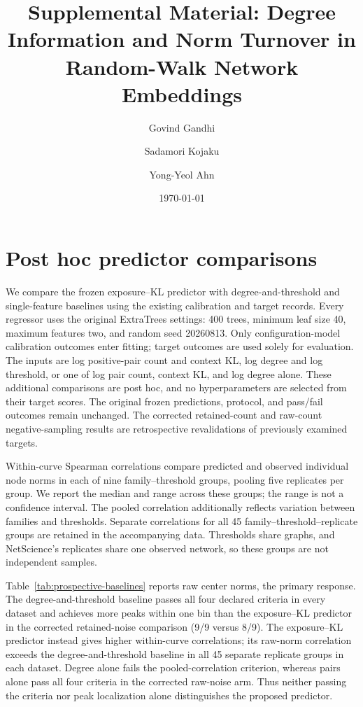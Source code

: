 \documentclass[aps,pre,onecolumn,10pt,superscriptaddress]{revtex4-2}
\begin{document}
\title{Supplemental Material: Degree Information and Norm Turnover in Random-Walk Network Embeddings}
\author{Govind Gandhi}
\author{Sadamori Kojaku}
\author{Yong-Yeol Ahn}
\date{\today}
\maketitle

\section{Post hoc predictor comparisons}
\label{sec:predictor-comparison}

We compare the frozen exposure--KL predictor with degree-and-threshold and single-feature baselines using the existing calibration and target records.
Every regressor uses the original ExtraTrees settings: 400 trees, minimum leaf size 40, maximum features two, and random seed 20260813.
Only configuration-model calibration outcomes enter fitting; target outcomes are used solely for evaluation.
The inputs are log positive-pair count and context KL, log degree and log threshold, or one of log pair count, context KL, and log degree alone.
These additional comparisons are post hoc, and no hyperparameters are selected from their target scores.
The original frozen predictions, protocol, and pass/fail outcomes remain unchanged.
The corrected retained-count and raw-count negative-sampling results are retrospective revalidations of previously examined targets.

Within-curve Spearman correlations compare predicted and observed individual node norms in each of nine family--threshold groups, pooling five replicates per group.
We report the median and range across these groups; the range is not a confidence interval.
The pooled correlation additionally reflects variation between families and thresholds.
Separate correlations for all 45 family--threshold--replicate groups are retained in the accompanying data.
Thresholds share graphs, and NetScience's replicates share one observed network, so these groups are not independent samples.

Table~\ref{tab:prospective-baselines} reports raw center norms, the primary response.
The degree-and-threshold baseline passes all four declared criteria in every dataset and achieves more peaks within one bin than the exposure--KL predictor in the corrected retained-noise comparison (9/9 versus 8/9).
The exposure--KL predictor instead gives higher within-curve correlations; its raw-norm correlation exceeds the degree-and-threshold baseline in all 45 separate replicate groups in each dataset.
Degree alone fails the pooled-correlation criterion, whereas pairs alone pass all four criteria in the corrected raw-noise arm.
Thus neither passing the criteria nor peak localization alone distinguishes the proposed predictor.
\end{document}
